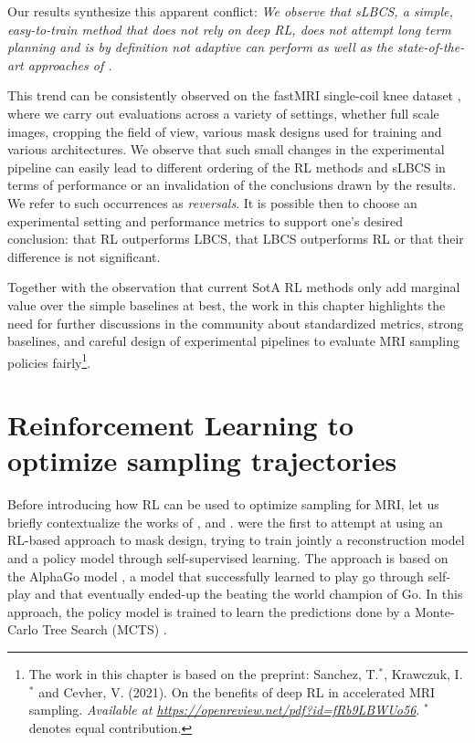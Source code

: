Our results synthesize this apparent conflict: \textit{We observe that sLBCS, a simple, easy-to-train method that does not rely on deep RL, does not attempt long term planning and is by definition not adaptive can perform as well as the state-of-the-art approaches of \citet{pineda2020active,bakker2020experimental}.} 

This trend can be consistently observed on the fastMRI single-coil knee dataset \citep{zbontarFastMRIOpenDataset2019}, where we carry out evaluations across a variety of settings, whether full scale images, cropping the field of view, various mask designs used for training and various architectures. We observe that such small changes in the experimental pipeline can easily lead to different ordering of the RL methods and sLBCS in terms of performance or an invalidation of the conclusions drawn by the results. We refer to such occurrences as \textit{reversals}.
It is possible then to choose an experimental setting and performance metrics to support one's desired conclusion: that RL outperforms LBCS, that LBCS outperforms RL or that their difference is not significant.  

Together with the observation that current SotA RL methods only add marginal value over the simple baselines at best, the work in this chapter highlights the need for further discussions in the community about standardized metrics, strong baselines, and careful design of experimental pipelines to evaluate MRI sampling policies fairly\footnote{The work in this chapter is based on the preprint: Sanchez, T.$^{*}$, Krawczuk, I.$^{*}$ and Cevher, V. (2021). On the benefits of deep RL in accelerated MRI sampling. \textit{Available at \url{https://openreview.net/pdf?id=fRb9LBWUo56}}. $^{*}$ denotes equal contribution.}.



\section{Reinforcement Learning to optimize sampling trajectories}

Before introducing how RL can be used to optimize sampling for MRI, let us briefly contextualize the works of \citet{jin2019self}, \citet{pineda2020active} and \citet{bakker2020experimental}.
\citet{jin2019self} were the first to attempt at using an RL-based approach to mask design, trying to train jointly a reconstruction model and a policy model through self-supervised learning. The approach is based on the AlphaGo model \citep{silver2017mastering}, a model that successfully learned to play go through self-play and that eventually ended-up the beating the world champion of Go. In this approach, the policy model is trained to learn the predictions done by a Monte-Carlo Tree Search (MCTS) \citep{coulom2006efficient}. 

